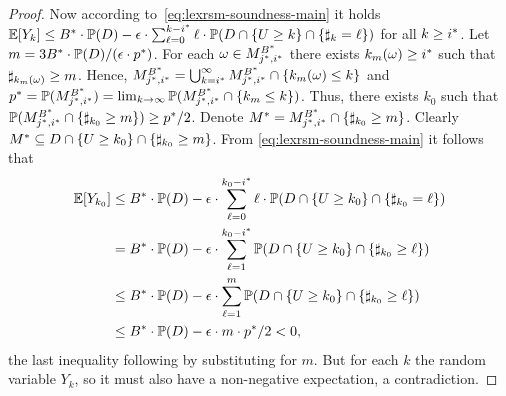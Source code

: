 \begin{proof}
Now according to~\eqref{eq:lexrsm-soundness-main} it holds  $\mathbb{E}[Y_k]\leq {B}^*\cdot \mathbb{P}(D) - \epsilon\cdot\sum_{\ell=0}^{k-{i}^*} \ell\cdot\mathbb{P}(D 
\cap \{U\geq k\} \cap \{\sharp_k 
= 
\ell\})$ for all $k\geq {i}^*$. Let $m=3{B}^*\cdot \mathbb{P}(D)/(\epsilon\cdot {p}^*)$. For each $\omega\in M_{{j}^*,{i}^*}^{{B}^*} $ there exists $k_m(\omega)\geq {i}^*$ such that $\sharp_{k_{m}(\omega)}\geq m$. Hence, $M_{{j}^*,{i}^*}^{{B}^*} = \bigcup_{k={i}^*}^{\infty} M_{{j}^*,{i}^*}^{{B}^*} \cap \{k_{m}(\omega) \leq k\}$ and ${p}^*=\mathbb{P}(M_{{j}^*,{i}^*}^{{B}^*})=\lim_{k\rightarrow \infty}\mathbb{P}(M_{{j}^*,{i}^*}^{{B}^*} \cap \{k_{m} \leq k\})$. Thus, there exists $k_0$ such that $\mathbb{P}(M_{{j}^*,{i}^*}^{{B}^*} \cap \{\sharp_{k_0}\geq m\}) \geq {p}^*/2$. Denote ${M}^*= M_{{j}^*,{i}^*}^{{B}^*} \cap \{\sharp_{k_0}\geq m\}$. Clearly ${M}^* \subseteq D\cap \{U\geq k_0 \} \cap \{\sharp_{k_0}\geq m \}$. From \eqref{eq:lexrsm-soundness-main} it follows that
\begin{align*}
\mathbb{E}[Y_{k_0}]&\leq {B}^*\cdot \mathbb{P}(D) - \epsilon\cdot\sum_{\ell=0}^{k_0-{i}^*} \ell\cdot\mathbb{P}(D 
\cap \{U\geq k_0\} \cap \{\sharp_{k_0} 
=
\ell\}) \\
&= {B}^*\cdot \mathbb{P}(D) - \epsilon\cdot \sum_{\ell=1}^{k_0-{i}^*} \mathbb{P}(D 
\cap \{U\geq k_0\} \cap \{\sharp_{k_0} 
\geq 
\ell\})\\
& \leq {B}^*\cdot \mathbb{P}(D) - \epsilon\cdot \sum_{\ell=1}^{m} \mathbb{P}(D 
\cap \{U\geq k_0\} \cap \{\sharp_{k_0} 
\geq 
\ell\})\\
&\leq {B}^*\cdot \mathbb{P}(D) - \epsilon\cdot m \cdot {p}^*/2 < 0, 
\end{align*}
the last inequality following by substituting for $m$. But for each $k$ the random variable $Y_k$, so it must also have a non-negative expectation, a contradiction.


	


% 
\end{proof}

